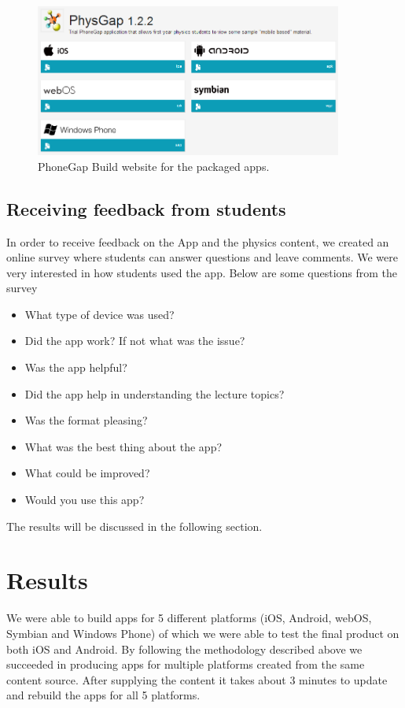 \documentclass[12pt,a4paper]{article}  %
\begin{document}
\begin{figure}[htb]
\centering
\includegraphics[width=0.9\textwidth]{phonegap.png}
\caption{PhoneGap Build website for the packaged apps.}
\label{fig:pg}
\end{figure}

\subsection{Receiving feedback from students}

In order to receive feedback on the App and the physics content, we created an online survey where students can answer questions and leave comments. We were very interested in how students used the app. Below are some questions from the survey

\begin{itemize}
\item What type of device was used?
\item Did the app work? If not what was the issue?
\item Was the app helpful?
\item Did the app help in understanding the lecture topics?
\item Was the format pleasing?
\item What was the best thing about the app?
\item What could be improved?
\item Would you use this app?
\end{itemize}

The results will be discussed in the following section.

\section{Results}

We were able to build apps for 5 different platforms (iOS, Android, webOS, Symbian and Windows Phone) of which we were able to test the final product on both iOS and Android. By following the methodology described above we succeeded in producing apps for multiple platforms created from the same content source. After supplying the content it takes about 3 minutes to update and rebuild the apps for all 5 platforms.
\end{document}
